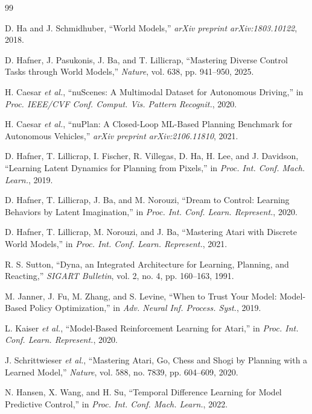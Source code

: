 \documentclass[10pt,journal,compsoc]{IEEEtran}
\begin{document}
\begingroup
\footnotesize
\setlength{\itemsep}{0pt}
\setlength{\parskip}{0pt}
\begin{thebibliography}{99}

D. Ha and J. Schmidhuber, ``World Models,'' \emph{arXiv preprint arXiv:1803.10122}, 2018.

D. Hafner, J. Pasukonis, J. Ba, and T. Lillicrap, ``Mastering Diverse Control Tasks through World Models,'' \emph{Nature}, vol. 638, pp. 941--950, 2025.

H. Caesar \emph{et al.}, ``nuScenes: A Multimodal Dataset for Autonomous Driving,'' in \emph{Proc. IEEE/CVF Conf. Comput. Vis. Pattern Recognit.}, 2020.

H. Caesar \emph{et al.}, ``nuPlan: A Closed-Loop ML-Based Planning Benchmark for Autonomous Vehicles,'' \emph{arXiv preprint arXiv:2106.11810}, 2021.

D. Hafner, T. Lillicrap, I. Fischer, R. Villegas, D. Ha, H. Lee, and J. Davidson, ``Learning Latent Dynamics for Planning from Pixels,'' in \emph{Proc. Int. Conf. Mach. Learn.}, 2019.

D. Hafner, T. Lillicrap, J. Ba, and M. Norouzi, ``Dream to Control: Learning Behaviors by Latent Imagination,'' in \emph{Proc. Int. Conf. Learn. Represent.}, 2020.

D. Hafner, T. Lillicrap, M. Norouzi, and J. Ba, ``Mastering Atari with Discrete World Models,'' in \emph{Proc. Int. Conf. Learn. Represent.}, 2021.

R. S. Sutton, ``Dyna, an Integrated Architecture for Learning, Planning, and Reacting,'' \emph{SIGART Bulletin}, vol. 2, no. 4, pp. 160--163, 1991.

M. Janner, J. Fu, M. Zhang, and S. Levine, ``When to Trust Your Model: Model-Based Policy Optimization,'' in \emph{Adv. Neural Inf. Process. Syst.}, 2019.

L. Kaiser \emph{et al.}, ``Model-Based Reinforcement Learning for Atari,'' in \emph{Proc. Int. Conf. Learn. Represent.}, 2020.

J. Schrittwieser \emph{et al.}, ``Mastering Atari, Go, Chess and Shogi by Planning with a Learned Model,'' \emph{Nature}, vol. 588, no. 7839, pp. 604--609, 2020.

N. Hansen, X. Wang, and H. Su, ``Temporal Difference Learning for Model Predictive Control,'' in \emph{Proc. Int. Conf. Mach. Learn.}, 2022.


\end{thebibliography}
\end{document}
